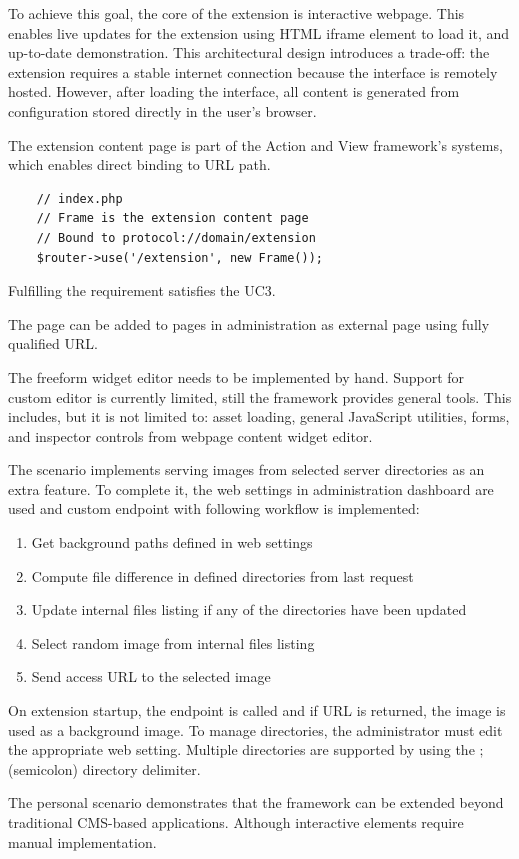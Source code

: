 To achieve this goal, the core of the extension is interactive webpage.
This enables live updates for the extension using HTML iframe element to load it, and up-to-date demonstration.
This architectural design introduces a trade-off: the extension requires a stable internet connection because the interface is remotely hosted.
However, after loading the interface, all content is generated from configuration stored directly in the user's browser.

The extension content page is part of the Action and View framework's systems, which enables direct binding to URL path.

\begin{verbatim}
    // index.php
    // Frame is the extension content page
    // Bound to protocol://domain/extension
    $router->use('/extension', new Frame());
\end{verbatim}

Fulfilling the requirement satisfies the UC3.

The page can be added to pages in administration as external page using fully qualified URL\@.

The freeform widget editor needs to be implemented by hand.
Support for custom editor is currently limited, still the framework provides general tools.
This includes, but it is not limited to:
asset loading, general JavaScript utilities, forms, and inspector controls from webpage content widget editor.

The scenario implements serving images from selected server directories as an extra feature.
To complete it, the web settings in administration dashboard are used and custom endpoint with following workflow is implemented:

\begin{enumerate}
    \item Get background paths defined in web settings
    \item Compute file difference in defined directories from last request
    \item Update internal files listing if any of the directories have been updated
    \item Select random image from internal files listing
    \item Send access URL to the selected image
\end{enumerate}

On extension startup, the endpoint is called and if URL is returned, the image is used as a background image.
To manage directories, the administrator must edit the appropriate web setting.
Multiple directories are supported by using the \(;\) (semicolon) directory delimiter.

The personal scenario demonstrates that the framework can be extended beyond traditional CMS-based applications.
Although interactive elements require manual implementation.
